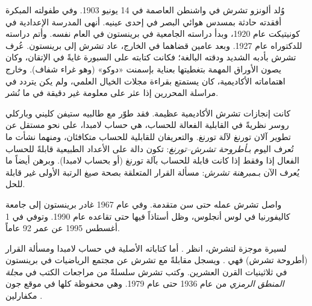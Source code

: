 \documentclass[../../../include/open-logic-section]{subfiles}
\begin{document}



وُلد ألونزو تشرش في واشنطن العاصمة في 14 يونيو 1903. وفي طفولته المبكرة
أفقدته حادثة بمسدس هوائي البصر في إحدى عينيه. أنهى المدرسة الإعدادية في
كونيتيكت عام 1920، وبدأ دراسته الجامعية في برينستون في العام نفسه. وأتم
دراسته للدكتوراه عام 1927. وبعد عامين قضاهما في الخارج، عاد تشرش إلى
برينستون. عُرف تشرش بأدبه الشديد ودقته البالغة؛ فكانت كتابته على السبورة
غايةً في الإتقان، وكان يصون الأوراق المهمة بتغطيتها بعناية بإسمنت «دوكو»
(وهو غراء شفاف). وخارج اهتماماته الأكاديمية، كان يستمتع بقراءة مجلات
الخيال العلمي، ولم يكن يتردد في مراسلة المحررين إذا عثر على معلومة غير
دقيقة في ما نُشر.

كانت إنجازات تشرش الأكاديمية عظيمة. فقد طوّر مع طالبيه ستيفن كليني وباركلي
روسر نظريةً في القابلية الفعالة للحساب، هي حساب لامبدا، على نحو مستقل عن
تطوير آلان تورنغ لآلة تورنغ. والتعريفان للقابلية للحساب متكافئان، ومنهما
نشأت ما تُعرف اليوم بـ\emph{أطروحة تشرش--تورنغ}: تكون دالة على الأعداد
الطبيعية قابلةً للحساب الفعال إذا وفقط إذا كانت قابلة للحساب بآلة تورنغ
(أو بحساب لامبدا). وبرهن أيضاً ما يُعرف الآن بـ\emph{مبرهنة تشرش}: مسألة
القرار المتعلقة بصحة صيغ الرتبة الأولى غير قابلة للحل.

واصل تشرش عمله حتى سن متقدمة. وفي عام 1967 غادر برينستون إلى جامعة
كاليفورنيا في لوس أنجلوس، وظل أستاذاً فيها حتى تقاعده عام 1990. وتوفي في
1 أغسطس 1995 عن عمر 92 عاماً.

\begin{reading}
لسيرة موجزة لتشرش، انظر \citet{EndertonND}. أما كتاباته الأصلية في حساب
لامبدا ومسألة القرار (أطروحة تشرش) فهي \citet{Church1936,Church1936a}.
ويسجل \citet{Aspray1984} مقابلةً مع تشرش عن مجتمع الرياضيات في برينستون
في ثلاثينيات القرن العشرين. وكتب تشرش سلسلةً من مراجعات الكتب في
\emph{مجلة المنطق الرمزي} من عام 1936 حتى عام 1979. وهي محفوظة كلها في
موقع جون مكفارلين \citep{MacFarlane2015}.
\end{reading}
\end{document}
